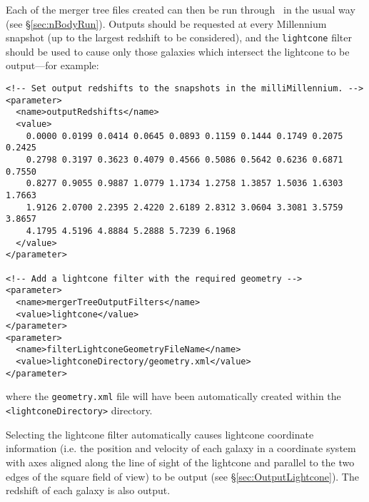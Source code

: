 Each of the merger tree files created can then be run through \glc\ in the usual way (see \S\ref{sec:nBodyRun}).  Outputs should be requested at every Millennium snapshot (up to the largest redshift to be considered), and the {\tt lightcone} filter should be used to cause only those galaxies which intersect the lightcone to be output---for example:
\begin{verbatim}
<!-- Set output redshifts to the snapshots in the milliMillennium. -->                                                                                                
<parameter>
  <name>outputRedshifts</name>
  <value>
    0.0000 0.0199 0.0414 0.0645 0.0893 0.1159 0.1444 0.1749 0.2075 0.2425
    0.2798 0.3197 0.3623 0.4079 0.4566 0.5086 0.5642 0.6236 0.6871 0.7550
    0.8277 0.9055 0.9887 1.0779 1.1734 1.2758 1.3857 1.5036 1.6303 1.7663
    1.9126 2.0700 2.2395 2.4220 2.6189 2.8312 3.0604 3.3081 3.5759 3.8657
    4.1795 4.5196 4.8884 5.2888 5.7239 6.1968
  </value>
</parameter>

<!-- Add a lightcone filter with the required geometry -->                                                                    
<parameter>
  <name>mergerTreeOutputFilters</name>
  <value>lightcone</value>
</parameter>
<parameter>
  <name>filterLightconeGeometryFileName</name>
  <value>lightconeDirectory/geometry.xml</value>
</parameter>                                                                                                                                                          
\end{verbatim}
where the {\tt geometry.xml} file will have been automatically created within the {\tt \textless lightconeDirectory\textgreater} directory.

Selecting the lightcone filter automatically causes lightcone coordinate information (i.e. the position and velocity of each galaxy in a coordinate system with axes aligned along the line of sight of the lightcone and parallel to the two edges of the square field of view) to be output (see \S\ref{sec:OutputLightcone}). The redshift of each galaxy is also output.
